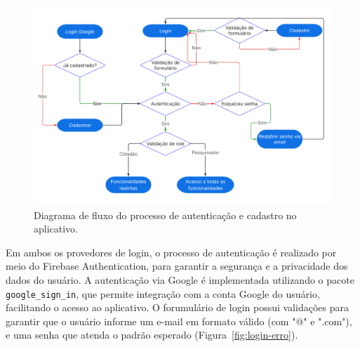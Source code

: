 \begin{figure}[H]
    \centering
    \includegraphics[width=1\textwidth]{diagrams/fluxograma_login-cadatro.pdf}
    \caption{Diagrama de fluxo do processo de autenticação e cadastro no aplicativo.}
    \label{fig:fluxo-login-cadastro}
\end{figure}

Em ambos os provedores de login, o processo de autenticação é realizado por meio do Firebase Authentication,
para garantir a segurança e a privacidade dos dados do usuário. A autenticação via Google
é implementada utilizando o pacote \texttt{google\_sign\_in}, que permite integração com a conta Google do usuário, 
facilitando o acesso ao aplicativo. O forumulário de login possui validações para garantir que o usuário
informe um e-mail em formato válido (com "@" e ".com"), e uma senha que atenda o padrão esperado (Figura~\ref{fig:login-erro}).

